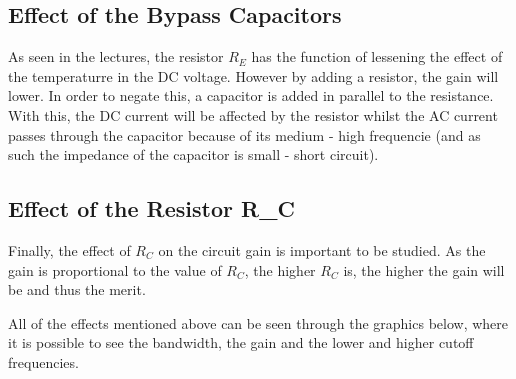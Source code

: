 \subsection{Effect of the Bypass Capacitors}

\par As seen in the lectures, the resistor $R_E$ has the function of lessening the effect of the temperaturre in the DC voltage. However by adding a resistor, the gain will lower. In order to negate this, a capacitor is added in parallel to the resistance. With this, the DC current will be affected by the resistor whilst the AC current passes through the capacitor because of its medium - high frequencie (and as such the impedance of the capacitor is small - short circuit).

\subsection{Effect of the Resistor R_C}

\par Finally, the effect of $R_C$ on the circuit gain is important to be studied. As the gain is proportional to the value of $R_C$, the higher $R_C$ is, the higher the gain will be and thus the merit. 

\par All of the effects mentioned above can be seen through the graphics below, where it is possible to see the bandwidth, the gain and the lower and higher cutoff frequencies.

